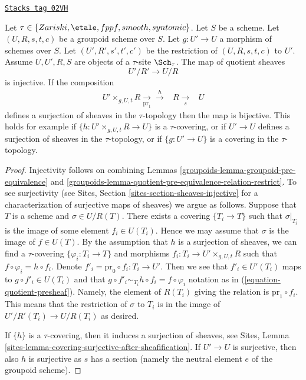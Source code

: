 \begin{lemma}
\label{groupoids-lemma-quotient-groupoid-restrict}
\href{https://stacks.math.columbia.edu/tag/02VH}{\texttt{Stacks tag 02VH}}

Let $\tau \in \{Zariski, \etale, fppf, smooth, syntomic\}$.
Let $S$ be a scheme.
Let $(U, R, s, t, c)$ be a groupoid scheme over $S$.
Let $g : U' \to U$ a morphism of schemes over $S$.
Let $(U', R', s', t', c')$ be the restriction of $(U, R, s, t, c)$ to $U'$.
Assume  $U, U', R, S$ are objects of a $\tau$-site $\Sch_\tau$.
The map of quotient sheaves
$$
U'/R' \longrightarrow U/R
$$
is injective. If the composition
$$
\begin{array}{ccc}U' \times_{g, U, t} R \underset{\text{pr}_1}{\longrightarrow}\overset{h}{\longrightarrow} & R \underset{s}{\longrightarrow} & U\end{array}
$$
defines a surjection of sheaves in the $\tau$-topology  then
the map is bijective. This holds for example if
$\{h : U' \times_{g, U, t} R \to U\}$ is a $\tau$-covering, or
if $U' \to U$ defines a surjection of sheaves in the $\tau$-topology, or if
$\{g : U' \to U\}$ is a covering in the $\tau$-topology.
\end{lemma}

\begin{proof}

Injectivity follows on combining
Lemmas \ref{groupoids-lemma-groupoid-pre-equivalence} and
\ref{groupoids-lemma-quotient-pre-equivalence-relation-restrict}.
To see surjectivity (see
Sites, Section \ref{sites-section-sheaves-injective}
for a characterization of surjective maps of sheaves) we argue as follows.
Suppose that $T$ is a scheme and $\sigma \in U/R(T)$.
There exists a covering $\{T_i \to T\}$ such that $\sigma|_{T_i}$
is the image of some element $f_i \in U(T_i)$. Hence we
may assume that $\sigma$ is the image of $f \in U(T)$.
By the assumption that $h$ is a surjection of sheaves, we
can find a $\tau$-covering $\{\varphi_i : T_i \to T\}$ and morphisms
$f_i : T_i \to U' \times_{g, U, t} R$ such that
$f \circ \varphi_i = h \circ f_i$. Denote
$f'_i = \text{pr}_0 \circ f_i : T_i \to U'$. Then we see that
$f'_i \in U'(T_i)$ maps to $g \circ f'_i \in U(T_i)$ and
that $g \circ f'_i \sim_{T_i} h \circ f_i = f \circ \varphi_i$
notation as in (\ref{equation-quotient-presheaf}). Namely, the
element of $R(T_i)$ giving the relation is $\text{pr}_1 \circ f_i$.
This means that the restriction
of $\sigma$ to $T_i$ is in the image of $U'/R'(T_i) \to U/R(T_i)$
as desired.

\medskip\noindent
If $\{h\}$ is a $\tau$-covering, then it induces a surjection of sheaves, see
Sites, Lemma \ref{sites-lemma-covering-surjective-after-sheafification}.
If $U' \to U$ is surjective, then also $h$ is surjective as $s$ has a section
(namely the neutral element $e$ of the groupoid scheme).
\end{proof}

